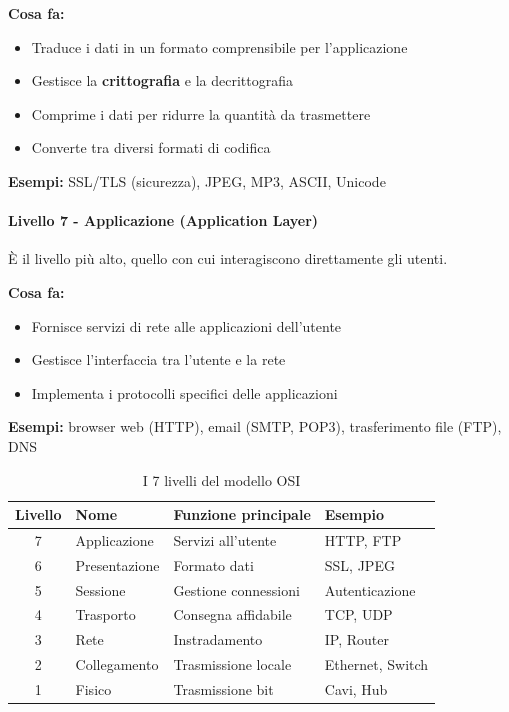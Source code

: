 \documentclass[12pt,a4paper]{article}
\begin{document}
\textbf{Cosa fa:}
\begin{itemize}
    \item Traduce i dati in un formato comprensibile per l'applicazione
    \item Gestisce la \textbf{crittografia} e la decrittografia
    \item Comprime i dati per ridurre la quantità da trasmettere
    \item Converte tra diversi formati di codifica
\end{itemize}

\textbf{Esempi:} SSL/TLS (sicurezza), JPEG, MP3, ASCII, Unicode

\paragraph{Livello 7 - Applicazione (Application Layer)}
È il livello più alto, quello con cui interagiscono direttamente gli utenti.

\textbf{Cosa fa:}
\begin{itemize}
    \item Fornisce servizi di rete alle applicazioni dell'utente
    \item Gestisce l'interfaccia tra l'utente e la rete
    \item Implementa i protocolli specifici delle applicazioni
\end{itemize}

\textbf{Esempi:} browser web (HTTP), email (SMTP, POP3), trasferimento file (FTP), DNS

\begin{table}[h]
\centering
\begin{tabular}{|c|l|l|l|}
\hline
\textbf{Livello} & \textbf{Nome} & \textbf{Funzione principale} & \textbf{Esempio} \\
\hline
7 & Applicazione & Servizi all'utente & HTTP, FTP \\
6 & Presentazione & Formato dati & SSL, JPEG \\
5 & Sessione & Gestione connessioni & Autenticazione \\
4 & Trasporto & Consegna affidabile & TCP, UDP \\
3 & Rete & Instradamento & IP, Router \\
2 & Collegamento & Trasmissione locale & Ethernet, Switch \\
1 & Fisico & Trasmissione bit & Cavi, Hub \\
\hline
\end{tabular}
\caption{I 7 livelli del modello OSI}
\end{table}
\end{document}
